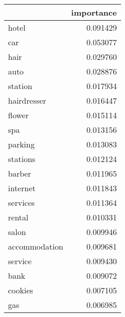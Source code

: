 \begin{tabular}{lr}
\toprule
{} &  importance \\
\midrule
hotel         &    0.091429 \\
car           &    0.053077 \\
hair          &    0.029760 \\
auto          &    0.028876 \\
station       &    0.017934 \\
hairdresser   &    0.016447 \\
flower        &    0.015114 \\
spa           &    0.013156 \\
parking       &    0.013083 \\
stations      &    0.012124 \\
barber        &    0.011965 \\
internet      &    0.011843 \\
services      &    0.011364 \\
rental        &    0.010331 \\
salon         &    0.009946 \\
accommodation &    0.009681 \\
service       &    0.009430 \\
bank          &    0.009072 \\
cookies       &    0.007105 \\
gas           &    0.006985 \\
\bottomrule
\end{tabular}
